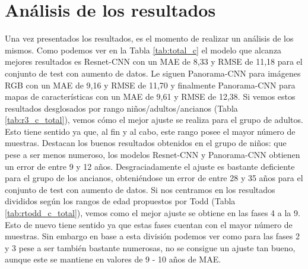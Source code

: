 \section{Análisis de los resultados}
Una vez presentados los resultados, es el momento de realizar un análisis de los mismos. Como podemos ver en la Tabla \ref{tab:total_c} el modelo que alcanza mejores resultados es Resnet-CNN con un MAE de 8,33 y RMSE de 11,18 para el conjunto de test con aumento de datos. Le siguen Panorama-CNN para imágenes RGB con un MAE de 9,16 y RMSE de 11,70 y finalmente Panorama-CNN para mapas de características con un MAE de 9,61 y RMSE de 12,38. Si vemos estos resultados desglosados por rango niños/adultos/ancianos (Tabla \ref{tab:r3_c_total}), vemos cómo el mejor ajuste se realiza para el grupo de adultos. Esto tiene sentido ya que, al fin y al cabo, este rango posee el mayor número de muestras. Destacan los buenos resultados obtenidos en el grupo de niños: que pese a ser menos numeroso, los modelos Resnet-CNN y Panorama-CNN obtienen un error de entre 9 y 12 años. Desgraciadamente el ajuste es bastante deficiente para el grupo de los ancianos, obteniéndose un error de entre 28 y 35 años para el conjunto de test con aumento de datos. Si nos centramos en los resultados divididos según los rangos de edad propuestos por Todd (Tabla \ref{tab:rtodd_c_total}), vemos como el mejor ajuste se obtiene en las fases 4 a la 9. Esto de nuevo tiene sentido ya que estas fases cuentan con el mayor número de muestras. Sin embargo en base a esta división podemos ver como para las fases 2 y 3 pese a ser también bastante numerosas, no se consigue un ajuste tan bueno, aunque este se mantiene en valores de 9 - 10 años de MAE.\\

